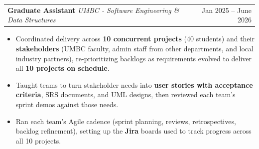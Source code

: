 \documentclass[letterpaper,11pt]{article}
\makeatletter
\newcommand{\BulletItems}[1]{
  \item
    \begin{itemize}[label={-}, leftmargin=*, labelsep=0.3em, topsep=0pt, partopsep=0pt, itemsep=0pt, parsep=0pt]
      \small #1
    \end{itemize}\vspace{-5pt}
}
\newcommand{\SLSubheadingItemThF}[3]{
  \vspace{-2pt}\item
    \begin{tabular*}{0.97\textwidth}[t]{l@{\extracolsep{\fill}}r}
      \textbf{#1} \textbar{} \textit{\small #2} & {\small #3} \\
    \end{tabular*}\vspace{-7pt}
}
\makeatother
\begin{document}
    \SLSubheadingItemThF
      {Graduate Assistant}
      {UMBC - Software Engineering \& Data Structures}
      {Jan 2025 -- June 2026}
    \BulletItems{
      \item Coordinated delivery across \textbf{10 concurrent projects} (40 students) and their \textbf{stakeholders} (UMBC faculty, admin staff from other departments, and local industry partners), re-prioritizing backlogs as requirements evolved to deliver all \textbf{10 projects on schedule}.
      \item Taught teams to turn stakeholder needs into \textbf{user stories with acceptance criteria}, SRS documents, and UML designs, then reviewed each team's sprint demos against those needs.
      \item Ran each team's Agile cadence (sprint planning, reviews, retrospectives, backlog refinement), setting up the \textbf{Jira} boards used to track progress across all 10 projects.
}
\end{document}
